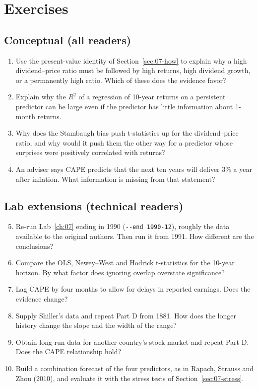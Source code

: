 \section*{Exercises}

\subsection*{Conceptual (all readers)}

\begin{enumerate}
  \item Use the present-value identity of Section~\ref{sec:07-how} to explain why a high dividend--price ratio must be followed by high returns, high dividend growth, or a permanently high ratio. Which of these does the evidence favor?
  \item Explain why the $R^2$ of a regression of 10-year returns on a persistent predictor can be large even if the predictor has little information about 1-month returns.
  \item Why does the Stambaugh bias push t-statistics up for the dividend--price ratio, and why would it push them the other way for a predictor whose surprises were positively correlated with returns?
  \item An adviser says CAPE predicts that the next ten years will deliver 3\% a year after inflation. What information is missing from that statement?
\end{enumerate}

\subsection*{Lab extensions (technical readers)}

\begin{enumerate}
  \setcounter{enumi}{4}
  \item Re-run Lab~\ref{ch:07} ending in 1990 (\texttt{-{}-end 1990-12}), roughly the data available to the original authors. Then run it from 1991. How different are the conclusions?
  \item Compare the OLS, Newey--West and Hodrick t-statistics for the 10-year horizon. By what factor does ignoring overlap overstate significance?
  \item Lag CAPE by four months to allow for delays in reported earnings. Does the evidence change?
  \item Supply Shiller's data and repeat Part D from 1881. How does the longer history change the slope and the width of the range?
  \item Obtain long-run data for another country's stock market and repeat Part D. Does the CAPE relationship hold?
  \item Build a combination forecast of the four predictors, as in Rapach, Strauss and Zhou (2010), and evaluate it with the stress tests of Section~\ref{sec:07-stress}.
\end{enumerate}